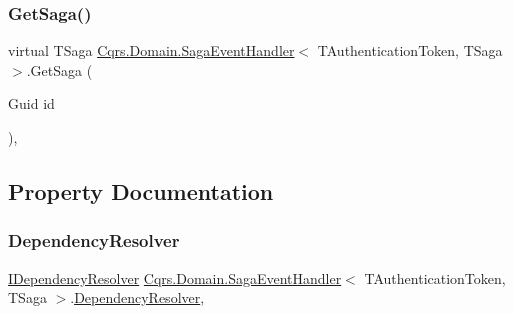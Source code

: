 \subsubsection{\texorpdfstring{Get\+Saga()}{GetSaga()}}
{\footnotesize\ttfamily virtual T\+Saga \hyperlink{classCqrs_1_1Domain_1_1SagaEventHandler}{Cqrs.\+Domain.\+Saga\+Event\+Handler}$<$ T\+Authentication\+Token, T\+Saga $>$.Get\+Saga (\begin{DoxyParamCaption}\item[{Guid}]{id }\end{DoxyParamCaption})\hspace{0.3cm}{\ttfamily [protected]}, {\ttfamily [virtual]}}



\subsection{Property Documentation}
\mbox{\label{classCqrs_1_1Domain_1_1SagaEventHandler_ad7497b0e19703aa351e571427a072d0d_ad7497b0e19703aa351e571427a072d0d}} 
\subsubsection{\texorpdfstring{Dependency\+Resolver}{DependencyResolver}}
{\footnotesize\ttfamily \hyperlink{interfaceCqrs_1_1Configuration_1_1IDependencyResolver}{I\+Dependency\+Resolver} \hyperlink{classCqrs_1_1Domain_1_1SagaEventHandler}{Cqrs.\+Domain.\+Saga\+Event\+Handler}$<$ T\+Authentication\+Token, T\+Saga $>$.\hyperlink{classCqrs_1_1Configuration_1_1DependencyResolver}{Dependency\+Resolver}\hspace{0.3cm}{\ttfamily [get]}, {\ttfamily [protected]}}

\mbox{\label{classCqrs_1_1Domain_1_1SagaEventHandler_a06c2d4b3720bec78e9cea40cb0ed2ff3_a06c2d4b3720bec78e9cea40cb0ed2ff3}} 
